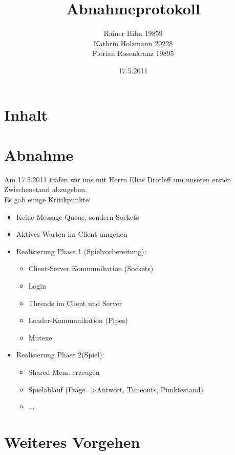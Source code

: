 \documentclass[a4paper,10pt]{article}
\title{Abnahmeprotokoll}
\author{Rainer Hihn 19859\\Kathrin Holzmann 20228\\Florian Rosenkranz 19895}
\date{17.5.2011}
\begin{document}
\maketitle
\newpage


\section*{Inhalt}

\tableofcontents

\newpage

\section{Abnahme}

Am 17.5.2011 trafen wir uns mit Herrn Elias Drotleff um unseren ersten Zwischenstand abzugeben.\\
Es gab einige Kritikpunkte:\\
\begin{itemize}
       \item Keine Message-Queue, sondern Sockets
       \item Aktives Warten im Client umgehen
       \item Realisierung Phase 1 (Spielvorbereitung):
       \begin{itemize}
	  \item Client-Server Kommunikation (Sockets)
	  \item Login
	  \item Threads im Client und Server
	  \item Loader-Kommunikation (Pipes)
	  \item Mutexe
	\end{itemize}
       \item Realisierung Phase 2(Spiel):
       \begin{itemize}
        \item Shared Mem. erzeugen
	\item Spielablauf (Frage=>Antwort, Timeouts, Punktestand)
	\item ...
       \end{itemize}

     \end{itemize}

\section{Weiteres Vorgehen}
\end{document}
